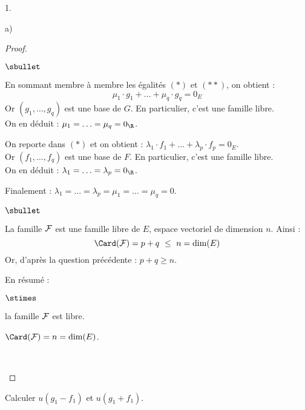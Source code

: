 \begin{noliste}{1.}
\begin{noliste}{a)}
\begin{proof}
\begin{remark}
\begin{noliste}{$\sbullet$}
        \item En sommant membre à membre les égalités $(*)$ et $(**)$,
          on obtient :
          \[
          \mu_1 \cdot g_1 + \ldots + \mu_q \cdot g_q = 0_E
          \]
          Or $(g_1,\hdots, g_q)$ est une base de $G$. En particulier,
          c'est une famille libre.\\
          On en déduit : $\mu_1 = \ldots = \mu_q = 0_{\R}$.
          
        \item On reporte dans $(*)$ et on obtient : $\lambda_1 \cdot
          f_1 + \ldots + \lambda_p \cdot f_p = 0_E$.\\
          Or $(f_1,\hdots, f_q)$ est une base de $F$. En particulier,
          c'est une famille libre.\\
          On en déduit : $\lambda_1 = \ldots = \lambda_p = 0_{\R}$.
          
        \item Finalement : $\lambda_1 = \ldots = \lambda_p = \mu_1 =
          \ldots = \mu_q = 0$.%
        \end{noliste}
      \end{remark}


    \newpage


    \begin{noliste}{$\sbullet$}
    \item La famille ${\cal F}$ est une famille libre de $E$, espace
      vectoriel de dimension $n$. Ainsi :
      \[
      \Card({\cal F}) = p+q \ \leq \ n = \dim(E)
      \]
      Or, d'après la question précédente : $p+q \geq n$.%
      
    \item En résumé :
      \begin{noliste}{$\stimes$}
      \item la famille ${\cal F}$ est libre.
      \item $\Card({\cal F}) = n = \dim(E)$.
      \end{noliste}
      ~\\[-1.6cm]
    \end{noliste}    
    \end{proof}
  
  \item Calculer $u(g_1-f_1)$ et $u(g_1+f_1)$.
    

\end{noliste}
\end{noliste}
